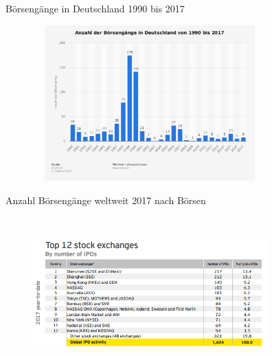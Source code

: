\documentclass{beamer}
\begin{document}

\begin{frame} {Börsengänge in Deutschland 1990 bis 2017}
\begin{figure}
	\centering
	\includegraphics[width=9cm, height=6cm]{anzboersengaenge.PNG}
\end{figure}
\end{frame}

\begin{frame} {Anzahl Börsengänge weltweit 2017 nach Börsen}
\begin{figure}
	\centering
	\includegraphics[width=9cm, height=6cm]{anzIPOs2017.PNG}
\end{figure}
\end{frame}
\end{document}
